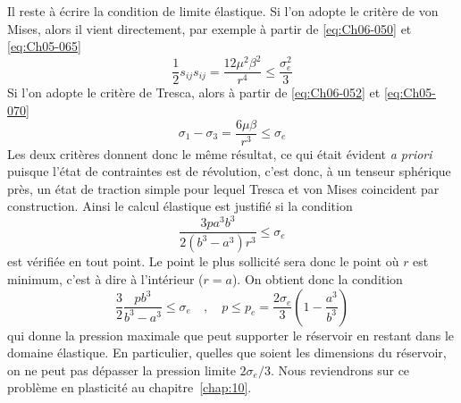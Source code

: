 Il reste à écrire la condition de limite élastique.
Si l'on adopte le critère de von Mises, alors il vient directement, par exemple à partir de \eqref{eq:Ch06-050} et \eqref{eq:Ch05-065}
\begin{equation}
    \frac{1}{2} s_{ij} s_{ij} = \frac{12 \mu^2 \beta^2}{r^4} \leq \frac{\sigma_e^2}{3}
    \label{eq:Ch06-055}
\end{equation}
Si l'on adopte le critère de Tresca, alors à partir de \eqref{eq:Ch06-052} et \eqref{eq:Ch05-070}
\begin{equation}
    \sigma_1 - \sigma_3 = \frac{6\mu\beta}{r^3} \leq \sigma_e
    \label{eq:Ch06-056}
\end{equation}
Les deux critères donnent donc le même résultat, ce qui était évident \textit{a priori} puisque l'état de contraintes est de révolution, c'est donc, à un tenseur sphérique près, un état de traction simple pour lequel Tresca et von Mises coincident par construction.
Ainsi le calcul élastique est justifié si la condition
\begin{equation}
    \frac{3pa^3b^3}{2\left( b^3 -a^3 \right)r^3} \leq \sigma_e
    \label{eq:Ch06-057}
\end{equation}
est vérifiée en tout point.
Le point le plus sollicité sera donc le point où $r$ est minimum, c'est à dire à l'intérieur ($r=a$).
On obtient donc la condition
\begin{equation}
    \frac{3}{2}\frac{pb^3}{b^3-a^3} \leq \sigma_e \quad , \quad p \leq p_e = \frac{2\sigma_e}{3} \left( 1 - \frac{a^3}{b^3} \right)
    \label{eq:Ch06-058}
\end{equation}
qui donne la pression maximale que peut supporter le réservoir en restant dans le domaine élastique.
En particulier, quelles que soient les dimensions du réservoir, on ne peut pas dépasser la pression limite $2\sigma_e/3$.
Nous reviendrons sur ce problème en plasticité au chapitre~\ref{chap:10}.


